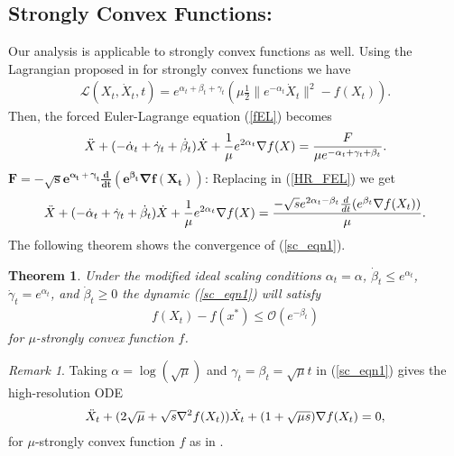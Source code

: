 \documentclass{article}
\theoremstyle{plain}
\newtheorem{theorem}{Theorem}[section]
\theoremstyle{definition}
\theoremstyle{remark}
\newtheorem{remark}{Remark}[theorem]
\begin{document}
\subsection{Strongly Convex Functions:} Our analysis is applicable to strongly convex functions as well. Using the Lagrangian proposed in \cite{wilson2021lyapunov} for strongly convex functions we have
\begin{align}\label{strongly_cvx_lagrange}
    \mathcal{L}(X_t,\dot X_t,t)=e^{\alpha_t+\beta_t+\gamma_t}(\mu \frac{1}{2}\|e^{-\alpha_t}\dot X_t\|^2-f(X_t)).
\end{align}
Then, the forced Euler-Lagrange equation (\ref{fEL}) becomes
\begin{align}\label{HR_FEL}
    \Ddot{X}+(-\dot \alpha_t + \dot 
 \gamma_t+ \dot \beta_t)\dot X+\frac{1}{\mu}e^{2\alpha_t}\nabla f(X)=\frac{F}{\mu e^{-\alpha_t + \gamma_t + \beta_t}}.
\end{align}
\(\boldsymbol{F=-\sqrt{s}e^{\alpha_t+\gamma_t}\frac{d}{dt}(e^{\beta_t}\nabla f(X_t))}\): Replacing in (\ref{HR_FEL}) we get
\begin{align}\label{sc_eqn1}
    \Ddot{X}+(-\dot \alpha_t + \dot 
 \gamma_t+ \dot \beta_t)\dot X+\frac{1}{\mu}e^{2\alpha_t}\nabla f(X)=\frac{-\sqrt{s}e^{2\alpha_t-\beta_t}\frac{d}{dt}(e^{\beta_t}\nabla f(X_t))}{\mu }.
\end{align}
The following theorem shows the convergence of (\ref{sc_eqn1}).
\begin{theorem}\label{Theorem3_1}
    Under the modified ideal scaling conditions \(\alpha_t=\alpha\), \(\dot \beta_t\leq e^{\alpha_t}\), \(\dot \gamma_t=e^{\alpha_t}\), and \(\dot \beta_t\geq 0\) the dynamic (\ref{sc_eqn1}) will satisfy
    \begin{align}\label{Theorem32_eqn1}
      f(X_t)-f(x^*)\leq \mathcal{O}(e^{-\beta_t})  
    \end{align}
    for \(\mu\)-strongly convex function \(f\).
\end{theorem}
\begin{remark}
    Taking \(\alpha=\log(\sqrt{\mu})\) and \(\gamma_t=\beta_t=\sqrt{\mu}t\) in (\ref{sc_eqn1}) gives the high-resolution ODE 
\begin{align}\label{high-res-ODE}
    \Ddot{X}_t+(2\sqrt{\mu}+\sqrt{s}\nabla^2 f(X_t))\dot X_t +(1+\sqrt{\mu s })\nabla f(X_t)=0,
\end{align}
for \(\mu\)-strongly convex function \(f\) as in \citep{Shi2021UnderstandingTA}.
\end{remark}
\end{document}
